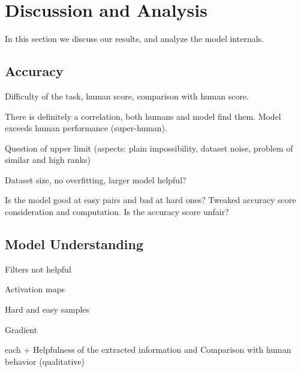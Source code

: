 \section{Discussion and Analysis}

In this section we discuss our results, and analyze the model internals.

\subsection{Accuracy}

Difficulty of the task, human score, comparison with human score.

There is definitely a correlation, both humans and model find them. Model exceeds human performance (super-human).

Question of upper limit (aspects: plain impossibility, dataset noise, problem of similar and high ranks)

Dataset size, no overfitting, larger model helpful?

Is the model good at easy pairs and bad at hard ones? Tweaked accuracy score consideration and computation. Is the accuracy score unfair?

\subsection{Model Understanding}

Filters not helpful

Activation maps

Hard and easy samples

Gradient

each + Helpfulness of the extracted information and Comparison with human behavior (qualitative)
